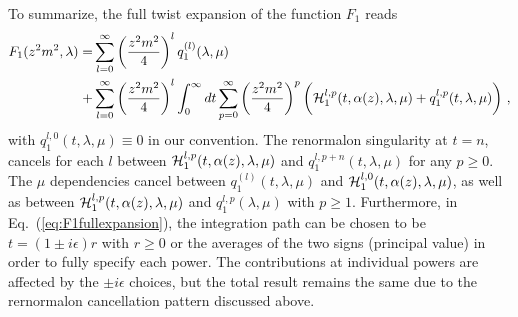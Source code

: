 \documentclass[a4paper,11pt]{article}
\begin{document}
To summarize, the full twist expansion of the function $F_1$ reads
\begin{align}\label{eq:F1fullexpansion}
F_1(z^2m^2,\lambda)=&\sum_{l=0}^{\infty} \left(\frac{z^2m^2}{4}\right)^l q_1^{(l)}(\lambda,\mu)\nonumber \\ 
+&\sum_{l=0}^{\infty} \left(\frac{z^2m^2}{4}\right)^l\int_{0}^{\infty} dt \sum_{p=0}^{\infty}\left(\frac{z^2m^2}{4}\right)^{p}\bigg({\cal H}_1^{l,p}(t,\alpha(z),\lambda,\mu)+q_{1}^{l,p}(t,\lambda,\mu)\bigg) \ ,
\end{align}
with $q_1^{l,0}(t,\lambda,\mu) \equiv 0$ in our convention. The renormalon singularity at $t=n$,  cancels for each $l$ between ${\cal H}_1^{l,p}(t,\alpha(z),\lambda,\mu)$ and $q_1^{l,p+n}(t,\lambda,\mu)$ for any $p \ge  0$. The $\mu$ dependencies cancel between $q_1^{(l)}(t,\lambda,\mu)$ and ${\cal H}_1^{l,0}(t,\alpha(z),\lambda,\mu)$, as well as between ${\cal H}_1^{l,p}(t,\alpha(z),\lambda,\mu)$ and $q_1^{l,p}(\lambda,\mu)$ with $p \ge 1$. Furthermore, in Eq.~(\ref{eq:F1fullexpansion}), the integration path can be chosen to be $t=(1 \pm i\epsilon)r$ with $r\ge 0$ or the averages of the two signs (principal value) in order to fully specify each power. The contributions at individual powers are affected by the $\pm i\epsilon$ choices, but the total result remains the same due to the rernormalon cancellation pattern discussed above. 
\end{document}
